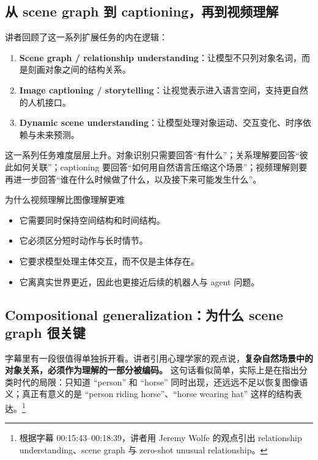 \subsection{从 scene graph 到 captioning，再到视频理解}

讲者回顾了这一系列扩展任务的内在逻辑：

\begin{enumerate}
    \item \textbf{Scene graph / relationship understanding}：让模型不只列对象名词，而是刻画对象之间的结构关系。
    \item \textbf{Image captioning / storytelling}：让视觉表示进入语言空间，支持更自然的人机接口。
    \item \textbf{Dynamic scene understanding}：让模型处理对象运动、交互变化、时序依赖与未来预测。
\end{enumerate}

这一系列任务难度层层上升。对象识别只需要回答``有什么''；关系理解要回答``彼此如何关联''；captioning 要回答``如何用自然语言压缩这个场景''；视频理解则要再进一步回答``谁在什么时候做了什么，以及接下来可能发生什么''。

\begin{knowledgebox}{为什么视频理解比图像理解更难}
\begin{itemize}
    \item 它需要同时保持空间结构和时间结构。
    \item 它必须区分短时动作与长时情节。
    \item 它要求模型处理主体交互，而不仅是主体存在。
    \item 它离真实世界更近，因此也更接近后续的机器人与 agent 问题。
\end{itemize}
\end{knowledgebox}

\subsection{Compositional generalization：为什么 scene graph 很关键}

字幕里有一段很值得单独拆开看。讲者引用心理学家的观点说，\textbf{复杂自然场景中的对象关系，必须作为理解的一部分被编码。} 这句话看似简单，实际上是在指出分类时代的局限：只知道 ``person'' 和 ``horse'' 同时出现，还远远不足以恢复图像语义；真正有意义的是 ``person riding horse''、``horse wearing hat'' 这样的结构表达。\footnote{根据字幕 00:15:43--00:18:39，讲者用 Jeremy Wolfe 的观点引出 relationship understanding、scene graph 与 zero-shot unusual relationship。}

